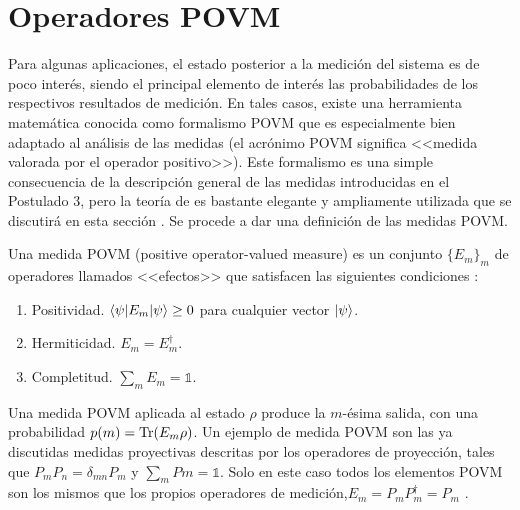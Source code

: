 \section{Operadores POVM}\label{operadoresPOVM} %
Para algunas aplicaciones, el estado posterior a la medición del sistema es de poco interés, siendo el
principal elemento de interés las probabilidades de los respectivos resultados
de medición. En tales casos, existe una herramienta matemática conocida como
formalismo POVM que es especialmente bien adaptado al análisis de las medidas
(el acrónimo POVM significa <<medida valorada por el operador positivo>>). Este
formalismo es una simple consecuencia de la descripción general de las medidas
introducidas en el Postulado 3, pero la teoría de es bastante elegante y
ampliamente utilizada que se discutirá en esta sección
{\cite{nielsen_chuang_2010}}. Se procede a dar una definición de las medidas
POVM\@. 

\begin{definition} Una medida POVM (positive operator-valued measure) es un conjunto $\{E_{m}\} _{m}$ de operadores llamados <<efectos>> que satisfacen las siguientes condiciones {\cite{2007geometry}}:
	\begin{enumerate}
		\item Positividad. $\langle \psi |E_m|\psi \rangle \ge 0 $ para cualquier vector $|\psi\rangle$.
		\item Hermiticidad. $E_m=E_{m}^\dagger$.
		\item  Completitud. $\sum_m E_m =\mathds{1}$.
	\end{enumerate}
\end{definition}

Una medida POVM aplicada al estado $\rho$ produce la $m$-ésima salida, con una
probabilidad $p(m)={\rm Tr}(E_m \rho)$. Un ejemplo de medida POVM son las ya discutidas medidas proyectivas descritas por los operadores de proyección, tales que $P_m P_n=\delta_{mn}P_{m}$ y $\sum_m Pm = \mathds{1}$. Solo en este caso todos los elementos POVM son los mismos que los propios operadores de medición,$E_m=P_m P_m^\dagger=P_m$ {\cite{nielsen_chuang_2010}}.


